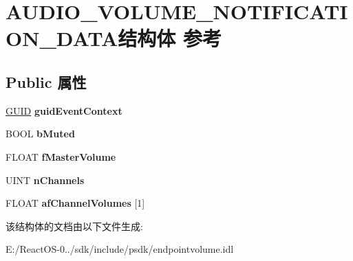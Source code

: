 \hypertarget{struct_a_u_d_i_o___v_o_l_u_m_e___n_o_t_i_f_i_c_a_t_i_o_n___d_a_t_a}{}\section{A\+U\+D\+I\+O\+\_\+\+V\+O\+L\+U\+M\+E\+\_\+\+N\+O\+T\+I\+F\+I\+C\+A\+T\+I\+O\+N\+\_\+\+D\+A\+T\+A结构体 参考}
\label{struct_a_u_d_i_o___v_o_l_u_m_e___n_o_t_i_f_i_c_a_t_i_o_n___d_a_t_a}
\subsection*{Public 属性}
\begin{DoxyCompactItemize}
\item 
\mbox{\label{struct_a_u_d_i_o___v_o_l_u_m_e___n_o_t_i_f_i_c_a_t_i_o_n___d_a_t_a_a6add2da9bc4c17887411d8b549b97eb4}} 
\hyperlink{interface_g_u_i_d}{G\+U\+ID} {\bfseries guid\+Event\+Context}
\item 
\mbox{\label{struct_a_u_d_i_o___v_o_l_u_m_e___n_o_t_i_f_i_c_a_t_i_o_n___d_a_t_a_ae432d9e04d50f86f3d5a0e37d71b4e6a}} 
B\+O\+OL {\bfseries b\+Muted}
\item 
\mbox{\label{struct_a_u_d_i_o___v_o_l_u_m_e___n_o_t_i_f_i_c_a_t_i_o_n___d_a_t_a_afb74fbe6c6dda74894c22d11a93148b4}} 
F\+L\+O\+AT {\bfseries f\+Master\+Volume}
\item 
\mbox{\label{struct_a_u_d_i_o___v_o_l_u_m_e___n_o_t_i_f_i_c_a_t_i_o_n___d_a_t_a_a98284a9869793fb797df699d3f6d66ff}} 
U\+I\+NT {\bfseries n\+Channels}
\item 
\mbox{\label{struct_a_u_d_i_o___v_o_l_u_m_e___n_o_t_i_f_i_c_a_t_i_o_n___d_a_t_a_a4301dbe566042e3312bbffbefaf363ff}} 
F\+L\+O\+AT {\bfseries af\+Channel\+Volumes} \mbox{[}1\mbox{]}
\end{DoxyCompactItemize}


该结构体的文档由以下文件生成\+:\begin{DoxyCompactItemize}
\item 
E\+:/\+React\+O\+S-\/0../sdk/include/psdk/endpointvolume.\+idl\end{DoxyCompactItemize}
